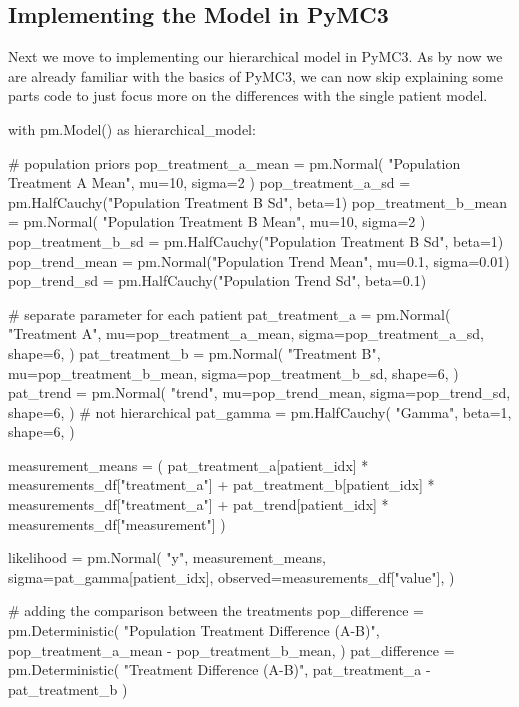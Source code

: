 \documentclass[12pt,a4paper,leqno]{report}
\theoremstyle{plain}
\theoremstyle{definition}
\theoremstyle{remark}
\begin{document}


\subsection{Implementing the Model in PyMC3}

Next we move to implementing our hierarchical model in PyMC3. As by now we are already
familiar with the basics of PyMC3, we can now skip explaining some parts code to just focus
more on the differences with the single patient model.

\bigskip
\begin{pyverbatim}[][fontsize=\footnotesize]

with pm.Model() as hierarchical_model:

    # population priors
    pop_treatment_a_mean = pm.Normal(
        "Population Treatment A Mean", mu=10, sigma=2
    )
    pop_treatment_a_sd = pm.HalfCauchy("Population Treatment B Sd", beta=1)
    pop_treatment_b_mean = pm.Normal(
        "Population Treatment B Mean", mu=10, sigma=2
    )
    pop_treatment_b_sd = pm.HalfCauchy("Population Treatment B Sd", beta=1)
    pop_trend_mean = pm.Normal("Population Trend Mean", mu=0.1, sigma=0.01)
    pop_trend_sd = pm.HalfCauchy("Population Trend Sd", beta=0.1)

    # separate parameter for each patient
    pat_treatment_a = pm.Normal(
        "Treatment A",
        mu=pop_treatment_a_mean,
        sigma=pop_treatment_a_sd,
        shape=6,
    )
    pat_treatment_b = pm.Normal(
        "Treatment B",
        mu=pop_treatment_b_mean,
        sigma=pop_treatment_b_sd,
        shape=6,
    )
    pat_trend = pm.Normal(
        "trend",
        mu=pop_trend_mean,
        sigma=pop_trend_sd,
        shape=6,
    )
    # not hierarchical
    pat_gamma = pm.HalfCauchy(
        "Gamma", beta=1, shape=6,
    )

    measurement_means = (
        pat_treatment_a[patient_idx] * measurements_df["treatment_a"]
        + pat_treatment_b[patient_idx] * measurements_df["treatment_a"]
        + pat_trend[patient_idx] * measurements_df["measurement"]
    )

    likelihood = pm.Normal(
        "y",
        measurement_means,
        sigma=pat_gamma[patient_idx],
        observed=measurements_df["value"],
    )

    # adding the comparison between the treatments
    pop_difference = pm.Deterministic(
        "Population Treatment Difference (A-B)",
        pop_treatment_a_mean - pop_treatment_b_mean,
    )
    pat_difference = pm.Deterministic(
        "Treatment Difference (A-B)", pat_treatment_a - pat_treatment_b
    )


\end{pyverbatim}
\end{document}
